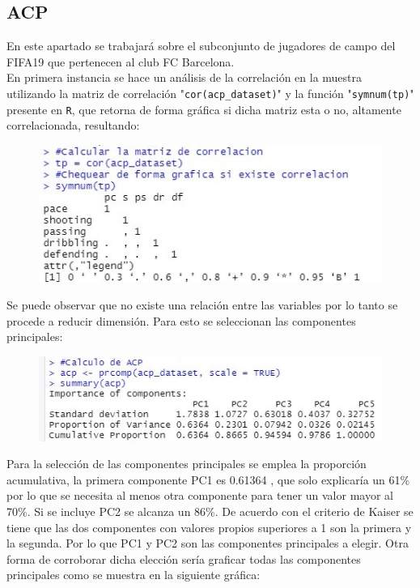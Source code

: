 \documentclass[a4paper,10pt,twocolumn]{article}
\begin{document}
\subsection*{ACP}

En este apartado se trabajará sobre el subconjunto de jugadores de campo del FIFA19 que pertenecen al club FC Barcelona.\\
En primera instancia se hace un análisis de la correlación en la muestra utilizando la matriz de correlación  "\verb|cor(acp_dataset)|" y la función "\verb|symnum(tp)|" presente en \verb|R|, que retorna de forma gráfica si dicha matriz esta o no, altamente correlacionada, resultando:

\begin{figure}[h]
	\includegraphics[scale=0.7]{./imgs/acp_correlation.jpg}
\end{figure}

Se puede observar que no existe una relación entre las variables por lo tanto se procede a reducir dimensión. Para esto se seleccionan las componentes principales:

\begin{figure}[h]
	\includegraphics[scale=0.6]{./imgs/acp_summary.jpg}
\end{figure}

Para la selección de las componentes principales se emplea la proporción acumulativa, la primera componente PC1 es 0.61364 , que solo explicaría un 61\% por lo que se necesita al menos otra componente para tener un valor mayor al 70\%. Si se incluye PC2 se alcanza un 86\%. De acuerdo con el criterio de Kaiser se tiene que las dos componentes con valores propios superiores a 1 son la primera y la segunda. Por lo que PC1 y PC2 son las componentes principales a elegir. Otra forma de corroborar dicha elección sería graficar todas las componentes principales como se muestra en la siguiente gráfica:
\end{document}
